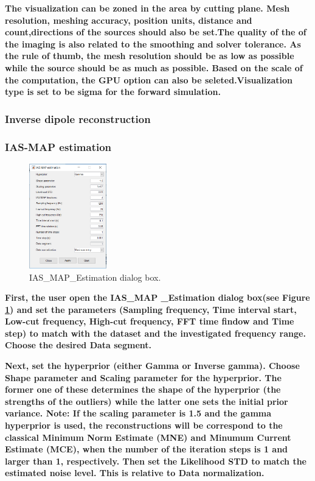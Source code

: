 \documentclass[5p]{elsarticle}
\begin{document}
\begin{frontmatter}
\bf The visualization can be zoned in the area by cutting plane. Mesh resolution, meshing accuracy, position units, distance and count,directions of the sources should also be set.The quality of the of the imaging is also related to the smoothing and solver tolerance. 
\bf As the rule of thumb, the mesh resolution should be as low as possible while the source should be as much as possible. Based on the scale of the computation, the GPU option can also be seleted.Visualization type is set to be sigma for the forward simulation. 

\subsubsection{Inverse dipole reconstruction}

\subsubsection{IAS-MAP estimation}

\begin{figure}[h!]
  \begin{center}
    \includegraphics[width=0.3\textwidth]{IAS.PNG}
  \end{center}
  \caption{IAS_MAP_Estimation dialog box.}
  \label{fig_6}
\end{figure}


\bf First, the user open the IAS_MAP _Estimation dialog box(see Figure \ref{fig_6}) and set the parameters  (Sampling frequency, Time interval start, Low-cut frequency, High-cut frequency, FFT time findow and Time step) to match with the dataset and the investigated frequency range. Choose the desired Data segment.

\bf Next, set the hyperprior (either Gamma or Inverse gamma). Choose Shape parameter and Scaling parameter for the hyperprior. The former one of these determines the shape of the hyperprior (the strengths of the outliers) while the latter one sets the initial prior variance. Note: If the scaling parameter is 1.5 and the gamma hyperprior is used, the reconstructions will be correspond to the classical Minimum Norm Estimate (MNE) and Minumum Current Estimate (MCE), when the number of the iteration steps is 1 and larger than 1, respectively.
Then set the Likelihood STD to match the estimated noise level. This is relative to Data normalization.


\end{frontmatter}
\end{document}
